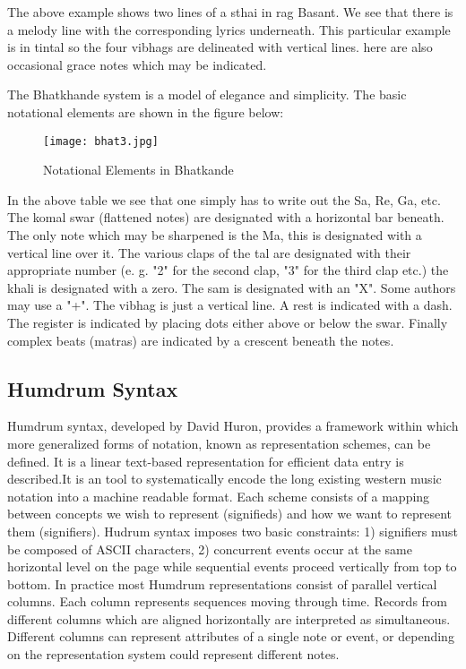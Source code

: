 \documentclass[12pt,a4paper]{article}
\begin{document}
The above example shows two lines of a sthai in rag Basant.  We see that there is a melody line with the corresponding lyrics underneath.  This particular example is in tintal so the four vibhags are delineated with vertical lines.
here are also occasional grace notes which may be indicated.

The Bhatkhande system is a model of elegance and simplicity.  The basic notational elements are shown in the figure below:

\begin{figure}[ht]
\centering
\texttt{[image: bhat3.jpg]}
\caption{Notational Elements in Bhatkande}
\label{fig:beta}
\end{figure}

In the above table we see that one simply has to write out the Sa, Re, Ga, etc.  The komal swar (flattened notes) are designated with a horizontal bar beneath.  The only note which may be sharpened is the Ma, this is designated with a vertical line over it.  The various claps of the tal are designated with their appropriate number (e. g. "2" for the second clap, "3" for the third clap etc.)  the khali is designated with a zero.  The sam is designated with an "X".  Some authors may use a "+".  The vibhag is just a vertical line.  A rest is indicated with a dash.  The register is indicated by placing dots either above or below the swar.  Finally complex beats (matras) are indicated by a crescent beneath the notes.



\subsection{Humdrum Syntax}


Humdrum syntax, developed by David Huron, provides a framework within which more generalized forms of notation, known as representation schemes, can be defined.  It is a linear text-based representation for efficient data entry is described.It is an tool to systematically encode the long existing western music notation into a machine readable format. Each scheme consists of a mapping between concepts we wish to represent (signifieds) and how we want to represent them (signifiers). Hudrum syntax imposes two basic constraints: 1) signifiers must be composed of ASCII characters, 2) concurrent events occur at the same horizontal level on the page while sequential events proceed vertically from top to bottom. In practice most Humdrum representations consist of parallel vertical columns. Each column represents sequences moving through time. Records from different columns which are aligned horizontally are interpreted as simultaneous. Different columns can represent attributes of a single note or event, or depending on the representation system could represent different notes.
\end{document}
